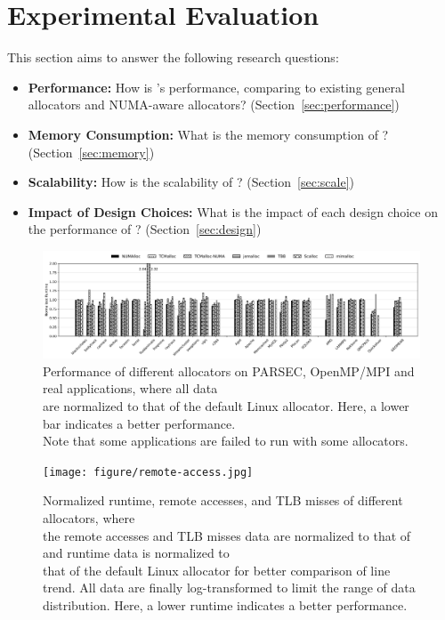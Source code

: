 \section{Experimental Evaluation}
\label{sec:evaluation}

This section aims to answer the following research questions: 

\begin{itemize}
\item \textbf{Performance:} How is \NM{}'s performance, comparing to existing general allocators and NUMA-aware allocators? (Section~\ref{sec:performance}) 
\item \textbf{Memory Consumption:} What is the memory consumption of \NM{}? (Section~\ref{sec:memory})
\item \textbf{Scalability:} How is the scalability of \NM{}? (Section~\ref{sec:scale})
\item \textbf{Impact of Design Choices:} What is the impact of each design choice on the performance of \NM{}? (Section~\ref{sec:design})	
\end{itemize}

\begin{figure}[!ht]
    \centering
    \includegraphics[width=7in]{figure/8-node-perf.jpg}
    \caption{Performance of different allocators on PARSEC, OpenMP/MPI and real applications, where all data\\ are normalized to that of the default Linux allocator. Here, a lower bar indicates a better performance. \\ Note that some applications are failed to run with some allocators.
    \label{fig:perf1}}
 \end{figure}
 
 
 \begin{figure}[!ht]
    \centering 
    \texttt{[image: figure/remote-access.jpg]}
    \caption{Normalized runtime, remote accesses, and TLB misses of different allocators, where \\ the remote accesses and TLB misses data are normalized to that of \NM{} and runtime data is normalized to \\ that of the default Linux allocator for better comparison of line trend. All data are finally log-transformed to limit the range of data distribution. Here, a lower runtime indicates a better performance.}
    \label{fig:remoteAccess}
\end{figure}



